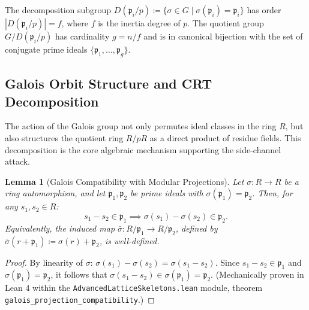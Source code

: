 \documentclass[11pt,a4paper]{article}
\theoremstyle{plain}
\newtheorem{lema}[teorema]{Lemma}
\theoremstyle{definition}
\numberwithin{equation}{section}
\newcommand{\fkp}{\mathfrak{p}}
\begin{document}
The decomposition subgroup $D(\fkp_i/p) \coloneqq \{\sigma \in G \mid \sigma(\fkp_i) = \fkp_i\}$ has order $|D(\fkp_i/p)| = f$, where $f$ is the inertia degree of $p$. The quotient group $G/D(\fkp_i/p)$ has cardinality $g = n/f$ and is in canonical bijection with the set of conjugate prime ideals $\{\fkp_1, \dots, \fkp_g\}$.

\subsection{Galois Orbit Structure and CRT Decomposition}
\label{subsec:orbitas_galois}

The action of the Galois group not only permutes ideal classes in the ring $R$, but also structures the quotient ring $R/pR$ as a direct product of residue fields. This decomposition is the core algebraic mechanism supporting the side-channel attack.

\begin{lema}[Galois Compatibility with Modular Projections]
\label{lem:proyeccion_galois}
Let $\sigma: R \to R$ be a ring automorphism, and let $\fkp_1, \fkp_2$ be prime ideals with $\sigma(\fkp_1) = \fkp_2$. Then, for any $s_1, s_2 \in R$:
\begin{equation}
s_1 - s_2 \in \fkp_1 \implies \sigma(s_1) - \sigma(s_2) \in \fkp_2.
\end{equation}
Equivalently, the induced map $\bar{\sigma}: R/\fkp_1 \to R/\fkp_2$, defined by $\bar{\sigma}(r + \fkp_1) \coloneqq \sigma(r) + \fkp_2$, is well-defined.
\end{lema}

\begin{proof}
By linearity of $\sigma$: $\sigma(s_1) - \sigma(s_2) = \sigma(s_1 - s_2)$. Since $s_1 - s_2 \in \fkp_1$ and $\sigma(\fkp_1) = \fkp_2$, it follows that $\sigma(s_1 - s_2) \in \sigma(\fkp_1) = \fkp_2$. (Mechanically proven in Lean 4 within the \texttt{AdvancedLatticeSkeletons.lean} module, theorem \texttt{galois\_projection\_compatibility}.)
\end{proof}
\end{document}
